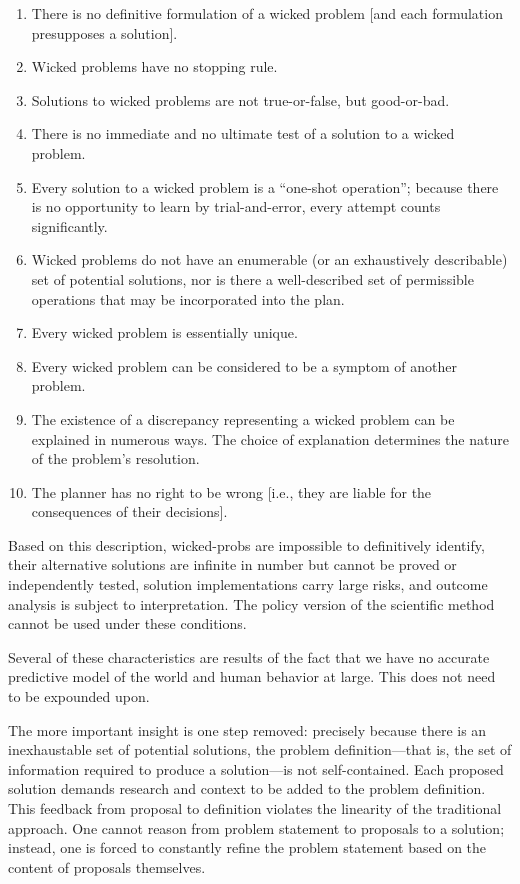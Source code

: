 \begin{displayquote}
  \begin{enumerate}
    \item There is no definitive formulation of a wicked problem [and each formulation presupposes a solution].
    \item Wicked problems have no stopping rule.
    \item Solutions to wicked problems are not true-or-false, but good-or-bad.
    \item There is no immediate and no ultimate test of a solution to a wicked problem.
    \item Every solution to a wicked problem is a ``one-shot operation''; because there is no opportunity to learn by
          trial-and-error, every attempt counts significantly.
    \item Wicked problems do not have an enumerable (or an exhaustively describable) set of potential solutions, nor is
          there a well-described set of permissible operations that may be incorporated into the plan.
    \item Every wicked problem is essentially unique.
    \item Every wicked problem can be considered to be a symptom of another problem.
    \item The existence of a discrepancy representing a wicked problem can be explained in numerous ways. The choice of
          explanation determines the nature of the problem's resolution.
    \item The planner has no right to be wrong [i.e., they are liable for the consequences of their decisions].
  \end{enumerate}
\end{displayquote}

Based on this description, \acp{wicked-prob} are impossible to definitively identify, their alternative solutions are
infinite in number but cannot be proved or independently tested, solution implementations carry large risks, and outcome
analysis is subject to interpretation. The policy version of the scientific method cannot be used under these
conditions.

Several of these characteristics are results of the fact that we have no accurate predictive model of the world and
human behavior at large. This does not need to be expounded upon.

The more important insight is one step removed: precisely because there is an inexhaustable set of potential solutions,
the problem definition---that is, the set of information required to produce a solution---is not self-contained. Each
proposed solution demands research and context to be added to the problem definition. This feedback from proposal to
definition violates the linearity of the traditional approach. One cannot reason from problem statement to proposals to
a solution; instead, one is forced to constantly refine the problem statement based on the content of proposals
themselves.

